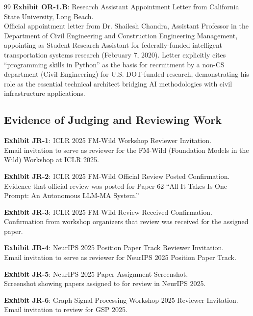\documentclass[11pt]{article}
\begin{document}
\begin{thebibliography}{99}
\textbf{Exhibit OR-1.B}: Research Assistant Appointment Letter from California State University, Long Beach.
\\Official appointment letter from Dr. Shailesh Chandra, Assistant Professor in the Department of Civil Engineering and Construction Engineering Management, appointing \dr as Student Research Assistant for federally-funded intelligent transportation systems research (February 7, 2020). Letter explicitly cites \drs ``programming skills in Python'' as the basis for recruitment by a non-CS department (Civil Engineering) for U.S. DOT-funded research, demonstrating his role as the essential technical architect bridging AI methodologies with civil infrastructure applications.

\subsection*{Evidence of Judging and Reviewing Work}

\textbf{Exhibit JR-1}: ICLR 2025 FM-Wild Workshop Reviewer Invitation.
\\Email invitation to serve as reviewer for the FM-Wild (Foundation Models in the Wild) Workshop at ICLR 2025.

\textbf{Exhibit JR-2}: ICLR 2025 FM-Wild Official Review Posted Confirmation.
\\Evidence that \drs official review was posted for Paper 62 ``All It Takes Is One Prompt: An Autonomous LLM-MA System.''

\textbf{Exhibit JR-3}: ICLR 2025 FM-Wild Review Received Confirmation.
\\Confirmation from workshop organizers that \drs review was received for the assigned paper.

\textbf{Exhibit JR-4}: NeurIPS 2025 Position Paper Track Reviewer Invitation.
\\Email invitation to serve as reviewer for NeurIPS 2025 Position Paper Track.

\textbf{Exhibit JR-5}: NeurIPS 2025 Paper Assignment Screenshot.
\\Screenshot showing papers assigned to \dr for review in NeurIPS 2025.

\textbf{Exhibit JR-6}: Graph Signal Processing Workshop 2025 Reviewer Invitation.
\\Email invitation to review for GSP 2025.


\end{thebibliography}
\end{document}
